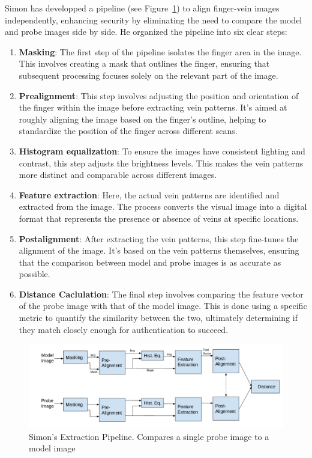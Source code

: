 Simon has developped a pipeline (see Figure~\ref{pipeline_simon}) to align finger-vein images independently, enhancing security by eliminating the need to compare the model and probe images side by side. He organized the pipeline into six clear steps:

\begin{enumerate}
    \item \textbf{Masking}: The first step of the pipeline isolates the finger area in the image. This involves creating a mask that outlines the finger, ensuring that subsequent processing focuses solely on the relevant part of the image.

    \item \textbf{Prealignment}: This step involves adjusting the position and orientation of the finger within the image before extracting vein patterns. It's aimed at roughly aligning the image based on the finger's outline, helping to standardize the position of the finger across different scans.

    \item \textbf{Histogram equalization}: To ensure the images have consistent lighting and contrast, this step adjusts the brightness levels. This makes the vein patterns more distinct and comparable across different images.

    \item \textbf{Feature extraction}: Here, the actual vein patterns are identified and extracted from the image. The process converts the visual image into a digital format that represents the presence or absence of veins at specific locations.

    \item \textbf{Postalignment}: After extracting the vein patterns, this step fine-tunes the alignment of the image. It's based on the vein patterns themselves, ensuring that the comparison between model and probe images is as accurate as possible.

    \item \textbf{Distance Caclulation}: The final step involves comparing the feature vector of the probe image with that of the model image. This is done using a specific metric to quantify the similarity between the two, ultimately determining if they match closely enough for authentication to succeed.
\end{enumerate} 

\begin{figure}[!h]
    \centering
    \includegraphics[width=1\linewidth]{latex-img/pipeline_simon.png}
    \caption{Simon's Extraction Pipeline. Compares a single probe image to a model image}
    \label{pipeline_simon}
\end{figure}

